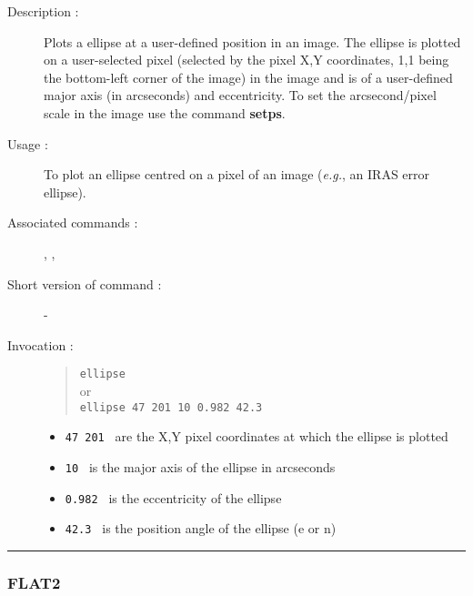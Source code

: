 \begin{description}

\item[Description :] Plots a ellipse at a user-defined position in an
image. The ellipse is plotted on a user-selected pixel (selected by the
pixel X,Y coordinates, 1,1 being the bottom-left corner of the image) in
the image and is of a user-defined major axis (in arcseconds) and
eccentricity. To set the arcsecond/pixel scale in the image use the
command {\bf setps}.

\item[Usage :] To plot an ellipse centred on a pixel of an image 
(\emph{e.g.}, an IRAS error ellipse).
\item[Associated commands :] {\tt {}}, 
{\tt {}}, {\tt {}}
\item[Short version of command :] -
\item[Invocation :]

\begin{quote}{\tt  ellipse }\\
or \\
{\tt ellipse 47 201 10 0.982 42.3 }
\end{quote}

\begin{itemize}

\item {\tt 47 201 } are the X,Y pixel coordinates at which the ellipse
is plotted
\item {\tt 10 } is the major axis of the ellipse in arcseconds
\item {\tt 0.982 } is the eccentricity of the ellipse
\item {\tt 42.3 } is the position angle of the ellipse (e or n)
\end{itemize}

\end{description}

\hrule 
\subsubsection*{\label{FLAT2}FLAT2}


